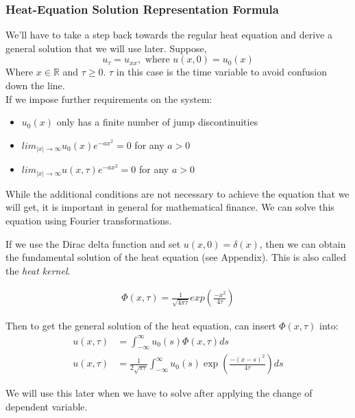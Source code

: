 \documentclass{article}
\begin{document}
\subsubsection*{Heat-Equation Solution Representation Formula}

We'll have to take a step back towards the regular heat equation and derive a general solution that we will use later. Suppose,
\begin{equation}
    u_{\tau} = u_{xx}, \text{ where }u(x,0) = u_{0}(x)
\end{equation}
Where $x \in \mathbb{R} $ and $\tau \ge 0$. $\tau$ in this case is the time variable to avoid confusion down the line.
\\
If we impose further requirements on the system: 
\begin{itemize}
\item $u_0(x)$ only has a finite number of jump discontinuities
\item $lim_{|x| \to \infty} u_{0}(x)e^{-ax^2} = 0$  for any $a > 0$ 
\item $lim_{|x| \to \infty} u(x, \tau)e^{-ax^2} = 0$  for any $a > 0$ 
\end{itemize} 
While the additional conditions are not necessary to achieve the equation that we will get, it is important in general for mathematical finance. We can solve this equation using Fourier transformations. \cite{steven_r_dunbar_solution_2009}

If we use the Dirac delta function and set $u(x,0) = \delta(x)$, then we can obtain the fundamental solution of the heat equation (see Appendix). This is also called the \emph{heat kernel}.

\begin{align*}
    \Phi(x,\tau) = \frac{1}{\sqrt{4\pi \tau}} exp(\frac{-x^2}{4\tau})
\end{align*}

Then to get the general solution of the heat equation, can insert $\Phi(x, \tau)$ into:
\begin{align*}
    u(x, \tau) &= \int_{-\infty}^{\infty} u_0(s) \Phi(x, \tau) ds \\
    u(x, \tau) &= \frac{1}{2\sqrt{\pi \tau}} \int_{-\infty}^{\infty} u_0(s) \exp(\frac{-(x-s)^2}{4\tau}) ds
\end{align*}

We will use this later when we have to solve after applying the change of dependent variable. \nocite{mahaffy_math_2020}
\end{document}
